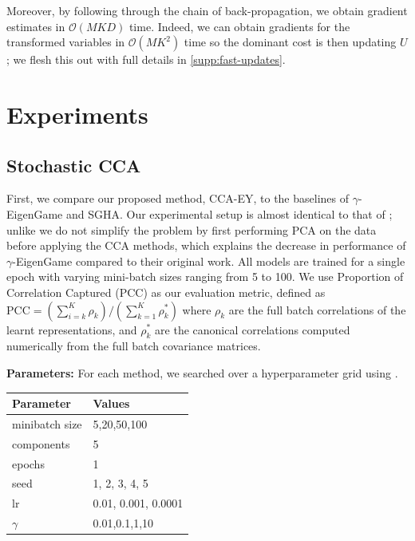 Moreover, by following through the chain of back-propagation, we obtain gradient estimates in $\mathcal{O}(MKD)$ time.
Indeed, we can obtain gradients for the transformed variables in $\mathcal{O}(M K^2)$ time so the dominant cost is then updating $U$; we flesh this out with full details in \cref{supp:fast-updates}.

\section{Experiments}


\subsection{Stochastic CCA}
First, we compare our proposed method, CCA-EY, to the baselines of $\gamma$-EigenGame and SGHA.
Our experimental setup is almost identical to that of \cite{meng2021online, gemp2022generalized}; unlike \cite{gemp2022generalized} we do not simplify the problem by first performing PCA on the data before applying the CCA methods, which explains the decrease in performance of $\gamma$-EigenGame compared to their original work.
All models are trained for a single epoch with varying mini-batch sizes ranging from 5 to 100. We use Proportion of Correlation Captured (PCC) as our evaluation metric, defined as \( \text{PCC} = (\sum_{i=k}^K \rho_k)/ ({\sum_{k=1}^K \rho_k^*}) \) where $\rho_k$ are the full batch correlations of the learnt representations, and $\rho_k^*$ are the canonical correlations computed numerically from the full batch covariance matrices.

\textbf{Parameters:} For each method, we searched over a hyperparameter grid using \citet{wandb}.

\begin{table}[h!]
    \centering
    \begin{tabular}{|l|l|}
        \hline Parameter             & Values              \\
        \hline minibatch size        & 5,20,50,100         \\
        \hline components            & 5                   \\
        \hline epochs                & 1                   \\
        \hline seed                  & 1, 2, 3, 4, 5       \\
        \hline lr                    & 0.01, 0.001, 0.0001 \\
        \hline $\gamma$\footnotemark & 0.01,0.1,1,10       \\
        \hline
    \end{tabular}
\end{table}

